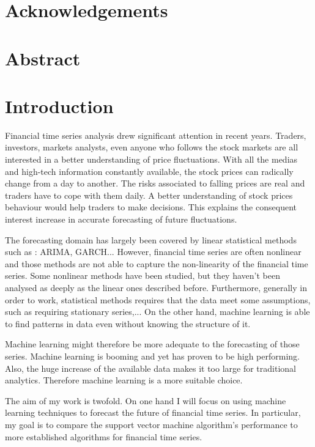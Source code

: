 \documentclass[11pt,a4paper,oneside]{book}
\begin{document}
\chapter*{Acknowledgements}


\tableofcontents


\chapter*{Abstract}


\chapter{Introduction}


Financial time series analysis drew significant attention in recent years. Traders, investors, markets analysts, even anyone who follows the stock markets are all interested in a better understanding of price fluctuations. With all the medias and high-tech information constantly available, the stock prices can radically change from a day to another. 
The risks associated to falling prices are real and traders have to cope with them daily. A better understanding of stock prices behaviour would help traders to make decisions. This explains the consequent interest increase in accurate forecasting of future fluctuations.

The forecasting domain has largely been covered by linear statistical methods such as : ARIMA, GARCH... However, financial time series are often nonlinear and those methods are not able
to capture the non-linearity of the financial time series. Some nonlinear methods have been studied, but they haven't been analysed as deeply as the linear ones described before. Furthermore, generally in order to work, statistical methods requires that the data meet some assumptions, such as requiring stationary series,... On the other hand, machine learning is able to find patterns in data even without knowing the structure of it. 

Machine learning might therefore be more adequate to the forecasting of those series. Machine learning is booming and yet has proven to be high performing. Also, the huge increase of the available data makes it too large for traditional analytics. Therefore machine learning is a more suitable choice.

The aim of my work is twofold. On one hand I will focus on using machine learning techniques to forecast the future of financial time series. In particular, my goal is to compare the support vector machine algorithm's performance to more established algorithms for financial time series.
\end{document}
